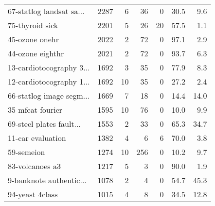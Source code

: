 \begin{table}[h]
\begin{center}
\begin{tabular}{l|r r r r r r}
67-statlog landsat sa... & 2287 & 6 & 36 & 0 &  30.5 &   9.6\\
75-thyroid sick & 2201 & 5 & 26 & 20 &  57.5 &   1.1\\\hline
45-ozone onehr & 2022 & 2 & 72 & 0 &  97.1 &   2.9\\
44-ozone eighthr & 2021 & 2 & 72 & 0 &  93.7 &   6.3\\
13-cardiotocography 3... & 1692 & 3 & 35 & 0 &  77.9 &   8.3\\\hline
12-cardiotocography 1... & 1692 & 10 & 35 & 0 &  27.2 &   2.4\\
66-statlog image segm... & 1669 & 7 & 18 & 0 &  14.4 &  14.0\\
35-mfeat fourier & 1595 & 10 & 76 & 0 &  10.0 &   9.9\\\hline
69-steel plates fault... & 1553 & 2 & 33 & 0 &  65.3 &  34.7\\
11-car evaluation & 1382 & 4 & 6 & 6 &  70.0 &   3.8\\
59-semeion & 1274 & 10 & 256 & 0 &  10.2 &   9.7\\\hline
83-volcanoes a3 & 1217 & 5 & 3 & 0 &  90.0 &   1.9\\
9-banknote authentic... & 1078 & 2 & 4 & 0 &  54.7 &  45.3\\
94-yeast 4class & 1015 & 4 & 8 & 0 &  34.5 &  12.8\\\hline\end{tabular}
\label{tab:n}
\end{center}
\end{table}
